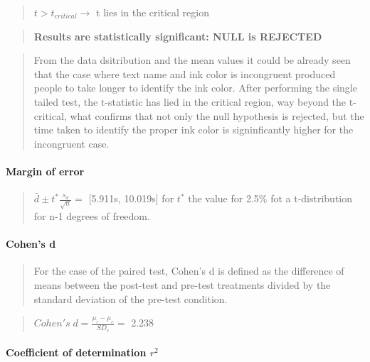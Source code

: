 \documentclass[]{article}
\let\oldparagraph\paragraph
\renewcommand{\paragraph}[1]{\oldparagraph{#1}\mbox{}}
\begin{document}
\begin{quote}
\(t> t_{critical} \rightarrow\) t lies in the critical region
\end{quote}

\begin{quote}
\textbf{ Results are statistically significant: NULL is REJECTED }
\end{quote}

\begin{quote}
From the data dsitribution and the mean values it could be already seen
that the case where text name and ink color is incongruent produced
people to take longer to identify the ink color. After performing the
single tailed test, the t-statistic has lied in the critical region, way
beyond the t-critical, what confirms that not only the null hypothesis
is rejected, but the time taken to identify the proper ink color is
signinficantly higher for the incongruent case.
\end{quote}

\paragraph{\texorpdfstring{\textbf{Margin of
error}}{Margin of error}}\label{margin-of-error}

\begin{quote}
\(\bar{d} \pm t^* \frac{s_d}{\sqrt{n}}=\) {[}5.911s, 10.019s{]} for
\(t^*\) the value for 2.5\% fot a t-distribution for n-1 degrees of
freedom.
\end{quote}

\paragraph{\texorpdfstring{\textbf{Cohen's
d}}{Cohen's d}}\label{cohens-d}

\begin{quote}
For the case of the paired test, Cohen's d is defined as the difference
of means between the post-test and pre-test treatments divided by the
standard deviation of the pre-test condition.
\end{quote}

\begin{quote}
\(Cohen's\; d= \frac{\mu_i-\mu_c}{SD_c}=\) 2.238
\end{quote}

\paragraph{\texorpdfstring{\textbf{Coefficient of determination
\(r^2\)}}{Coefficient of determination r\^{}2}}\label{coefficient-of-determination-r2}
\end{document}
